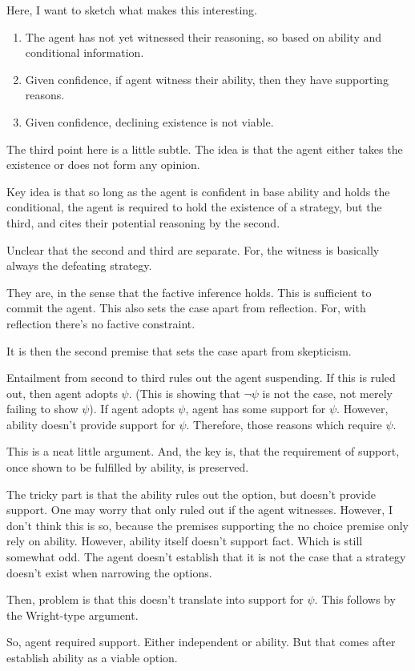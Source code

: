 \documentclass[10pt]{article}
\begin{document}
\begin{note}
  Here, I want to sketch what makes this interesting.

  \begin{enumerate}
  \item The agent has not yet witnessed their reasoning, so based on ability and conditional information.
  \item Given confidence, if agent witness their ability, then they have supporting reasons.
  \item Given confidence, declining existence is not viable.
  \end{enumerate}

  The third point here is a little subtle.
  The idea is that the agent either takes the existence or does not form any opinion.

  Key idea is that so long as the agent is confident in base ability and holds the conditional, the agent is required to hold the existence of a strategy, but the third, and cites their potential reasoning by the second.

  Unclear that the second and third are separate.
  For, the witness is basically always the defeating strategy.
  {
    \color{red}
    They are, in the sense that the factive inference holds.
    This is sufficient to commit the agent.
    This also sets the case apart from reflection.
    For, with reflection there's no factive constraint.

    It is then the second premise that sets the case apart from skepticism.
  }


  Entailment from second to third rules out the agent suspending.
  If this is ruled out, then agent adopts \(\psi\). (This is showing that \(\lnot\psi\) is not the case, not merely failing to show \(\psi\)).
  If agent adopts \(\psi\), agent has some support for \(\psi\).
  However, ability doesn't provide support for \(\psi\).
  Therefore, those reasons which require \(\psi\).

  This is a neat little argument.
  And, the key is, that the requirement of support, once shown to be fulfilled by ability, is preserved.

  The tricky part is that the ability rules out the option, but doesn't provide support.
  One may worry that only ruled out if the agent witnesses.
  However, I don't think this is so, because the premises supporting the no choice premise only rely on ability.
  However, ability itself doesn't support fact.
  Which is still somewhat odd.
  The agent doesn't establish that it is not the case that a strategy doesn't exist when narrowing the options.

  Then, problem is that this doesn't translate into support for \(\psi\).
  This follows by the Wright-type argument.

  So, agent required support.
  Either independent or ability.
  But that comes after establish ability as a viable option.
\end{note}
\end{document}

